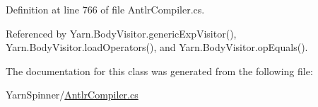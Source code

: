 Definition at line 766 of file Antlr\-Compiler.\-cs.



Referenced by Yarn.\-Body\-Visitor.\-generic\-Exp\-Visitor(), Yarn.\-Body\-Visitor.\-load\-Operators(), and Yarn.\-Body\-Visitor.\-op\-Equals().



The documentation for this class was generated from the following file\-:\begin{DoxyCompactItemize}
\item 
Yarn\-Spinner/\hyperlink{a00303}{Antlr\-Compiler.\-cs}\end{DoxyCompactItemize}
